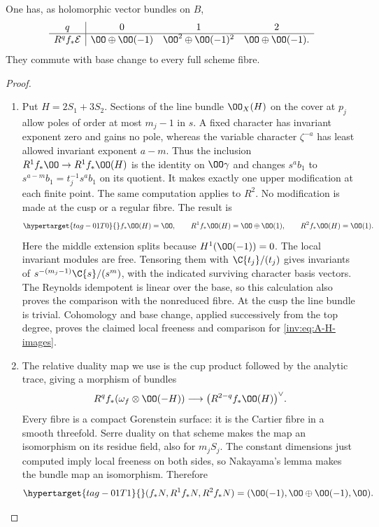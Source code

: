 \begin{proposition}\hypertarget{tag-01RS}{}\label{inv:A1.2}\label{wb:prop:log-relative-direct-images}

One has, as holomorphic vector bundles on $B$,
\[
\begin{array}{c|ccc}
q&0&1&2\\\hline
R^qf_*\mathcal E&\OO\oplus\OO(-1)&
 \OO^2\oplus\OO(-1)^2&\OO\oplus\OO(-1).
\end{array}
\]
They commute with base change to every full scheme fibre.
\end{proposition}


\begin{proof}
\begin{enumerate}[label=\arabic*.,leftmargin=*]
\item Put $H=2S_1+3S_2$.  Sections of the line bundle $\OO_X(H)$
on the cover at $p_j$ allow poles of order at most $m_j-1$
in $s$.  A fixed character has invariant exponent zero and gains no
pole, whereas the variable character $\zeta^{-a}$ has least allowed
invariant exponent $a-m$.  Thus the inclusion
$R^1f_*\OO\to R^1f_*\OO(H)$ is the identity on $\OO\gamma$ and
changes $s^ab_1$ to $s^{a-m}b_1=t_j^{-1}s^ab_1$ on its quotient.
It makes exactly one upper modification at each finite point.
The same computation applies to $R^2$.  No modification is made at
the cusp or a regular fibre.  The result is
\begin{equation}\hypertarget{tag-01T0}{}\label{inv:eq:A-H-images}
f_*\OO(H)=\OO,\qquad
R^1f_*\OO(H)=\OO\oplus\OO(1),\qquad
R^2f_*\OO(H)=\OO(1).
\end{equation}
Here the middle extension splits because $H^1(\OO(-1))=0$.
The local invariant modules are free.  Tensoring them with
$\C\{t_j\}/(t_j)$ gives invariants of
$s^{-(m_j-1)}\C\{s\}/(s^m)$, with the indicated surviving character
basis vectors.  The Reynolds idempotent is linear over the base,
so this calculation also proves the comparison with the nonreduced
fibre.  At the cusp the line bundle is trivial.  Cohomology and base
change, applied successively from the top degree, proves the claimed
local freeness and comparison for \eqref{inv:eq:A-H-images}.

\item The relative duality map we use is the cup product followed
by the analytic trace, giving a morphism of bundles
\[
R^qf_*(\omega_f\otimes\OO(-H))\longrightarrow
\bigl(R^{2-q}f_*\OO(H)\bigr)^\vee.
\]
Every fibre is a compact Gorenstein surface: it is the Cartier fibre
in a smooth threefold.  Serre duality on that scheme makes the map
an isomorphism on its residue field, also for $m_jS_j$.  The constant
dimensions just computed imply local freeness on both sides, so
Nakayama's lemma makes the bundle map an isomorphism.  Therefore
\begin{equation}\hypertarget{tag-01T1}{}\label{inv:eq:A-N-images}
(f_*N,R^1f_*N,R^2f_*N)
=(\OO(-1),\OO\oplus\OO(-1),\OO).
\end{equation}


\end{enumerate}
\end{proof}
